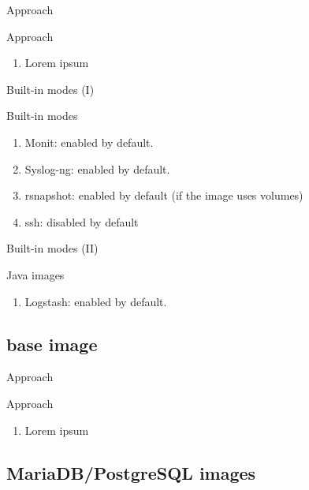 \documentclass{beamer}
\begin{document}
\begin{frame}{Approach}
  \begin{block}{Approach}
    \begin{enumerate}
    \item Lorem ipsum
    \end{enumerate}
  \end{block}
\end{frame}

\begin{frame}{Built-in modes (I)}
  \begin{block}{Built-in modes}
    \begin{enumerate}
    \item Monit: enabled by default.
    \item Syslog-ng: enabled by default.
    \item rsnapshot: enabled by default (if the image uses volumes)
    \item ssh: disabled by default
    \end{enumerate}
  \end{block}
\end{frame}

\begin{frame}{Built-in modes (II)}
  \begin{block}{Java images}
    \begin{enumerate}
    \item Logstash: enabled by default.
    \end{enumerate}
  \end{block}
\end{frame}

\subsection{base image}

\begin{frame}{Approach}
  \begin{block}{Approach}
    \begin{enumerate}
    \item Lorem ipsum
    \end{enumerate}
  \end{block}
\end{frame}

\subsection{MariaDB/PostgreSQL images}
\end{document}
